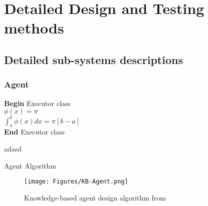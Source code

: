\chapter{  Detailed Design and Testing methods } 
\label{Detailed_design}









\section{Detailed sub-systems descriptions}


\subsection{Agent}

\begin{algorithm}[H]
\SetAlgoLined
{}
	\Indp
	\textbf{Begin} Executor class \\
	$\phi(x)=\pi$\\
	$\int_{a}^{b} \phi(x) dx=\pi[b-a]$\\
	\textbf{End} Executor class
  
  \Indm adasd 
 \caption{Agent Algorithm}
\end{algorithm}


\begin{figure}[H]
    \centering
    \texttt{[image: Figures/KB-Agent.png]}
    \caption{Knowledge-based agent design algorithm from \cite{russell2016artificial}}
    \label{fig:sysdiag}
\end{figure}



